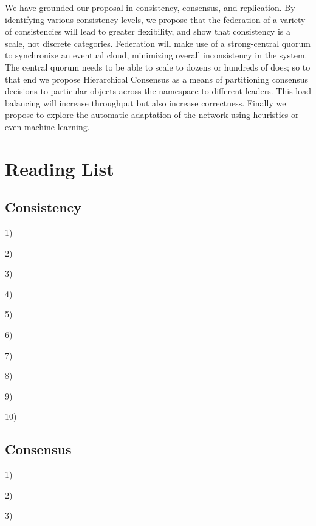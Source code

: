 \documentclass{article}
\begin{document}
We have grounded our proposal in consistency, consensus, and replication. By identifying various consistency levels, we propose that the federation of a variety of consistencies will lead to greater flexibility, and show that consistency is a scale, not discrete categories. Federation will make use of a strong-central quorum to synchronize an eventual cloud, minimizing overall inconsistency in the system. The central quorum needs to be able to scale to dozens or hundreds of does; so to that end we propose Hierarchical Consensus as a means of partitioning consensus decisions to particular objects across the namespace to different leaders. This load balancing will increase throughput but also increase correctness. Finally we propose to explore the automatic adaptation of the network using heuristics or even machine learning.

\newpage

\appendix
\section{Reading List}
\label{app:readinglist}

\subsection{Consistency}

1) 

2) 

3) 

4) 

5) 

6) 

7) 

8) 

9) 

10) 

\subsection{Consensus}

1) 

2) 

3) 
\end{document}
